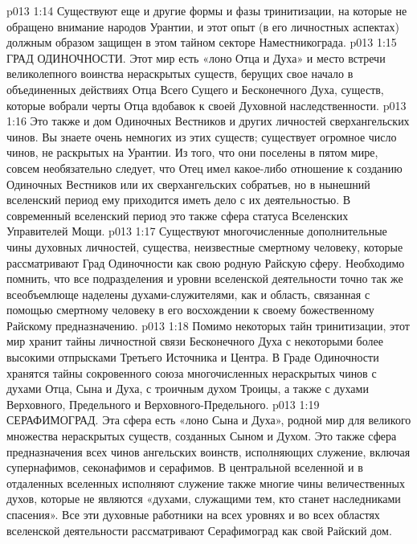 \vs p013 1:14 Существуют еще и другие формы и фазы тринитизации, на которые не обращено внимание народов Урантии, и этот опыт (в его личностных аспектах) должным образом защищен в этом тайном секторе Наместникограда.
\vs p013 1:15 \pc {}\bibnobreakspace ГРАД ОДИНОЧНОСТИ. Этот мир есть «лоно Отца и Духа» и место встречи великолепного воинства нераскрытых существ, берущих свое начало в объединенных действиях Отца Всего Сущего и Бесконечного Духа, существ, которые вобрали черты Отца вдобавок к своей Духовной наследственности.
\vs p013 1:16 Это также и дом Одиночных Вестников и других личностей сверхангельских чинов. Вы знаете очень немногих из этих существ; существует огромное число чинов, не раскрытых на Урантии. Из того, что они поселены в пятом мире, совсем необязательно следует, что Отец имел какое\hyp{}либо отношение к созданию Одиночных Вестников или их сверхангельских собратьев, но в нынешний вселенский период ему приходится иметь дело с их деятельностью. В современный вселенский период это также сфера статуса Вселенских Управителей Мощи.
\vs p013 1:17 Существуют многочисленные дополнительные чины духовных личностей, существа, неизвестные смертному человеку, которые рассматривают Град Одиночности как свою родную Райскую сферу. Необходимо помнить, что все подразделения и уровни вселенской деятельности точно так же всеобъемлюще наделены духами\hyp{}служителями, как и область, связанная с помощью смертному человеку в его восхождении к своему божественному Райскому предназначению.
\vs p013 1:18 \pc {} Помимо некоторых тайн тринитизации, этот мир хранит тайны личностной связи Бесконечного Духа с некоторыми более высокими отпрысками Третьего Источника и Центра. В Граде Одиночности хранятся тайны сокровенного союза многочисленных нераскрытых чинов с духами Отца, Сына и Духа, с троичным духом Троицы, а также с духами Верховного, Предельного и Верховного\hyp{}Предельного.
\vs p013 1:19 \pc {}\bibnobreakspace СЕРАФИМОГРАД. Эта сфера есть «лоно Сына и Духа», родной мир для великого множества нераскрытых существ, созданных Сыном и Духом. Это также сфера предназначения всех чинов ангельских воинств, исполняющих служение, включая супернафимов, секонафимов и серафимов. В центральной вселенной и в отдаленных вселенных исполняют служение также многие чины величественных духов, которые не являются «духами, служащими тем, кто станет наследниками спасения». Все эти духовные работники на всех уровнях и во всех областях вселенской деятельности рассматривают Серафимоград как свой Райский дом.
